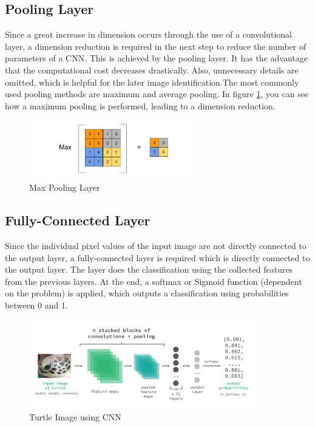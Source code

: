 \subsection{Pooling Layer}
Since a great increase in dimension occurs through the use of a convolutional layer, a dimension reduction is required in the next step to reduce the number of parameters of a CNN. This is achieved by the pooling layer. It has the advantage that the computational cost decreases drastically. Also, unnecessary details are omitted, which is helpful for the later image identification.The most commonly used pooling methods are maximum and average pooling. In figure \ref{fig:poolingLayer}, you can see how a maximum pooling is performed, leading to a dimension reduction.

\begin{figure}[htb]
    \centering
    \includegraphics[width=7cm]{images/maxpooling.jpg}
    \caption{Max Pooling Layer}
    \label{fig:poolingLayer}
\end{figure}

\subsection{Fully-Connected Layer}
Since the individual pixel values of the input image are not directly connected to the output layer, a fully-connected layer is required which is directly connected to the output layer. The layer does the classification using the collected features from the previous layers. At the end, a softmax or Sigmoid function (dependent on the problem) is applied, which outputs a classification using probabilities between 0 and 1.

\begin{figure}[htb]
    \centering
    \includegraphics[width=10cm]{images/cnn_turtle_pooling.png}
    \caption{Turtle Image using CNN}
    \label{fig:turtleCNN}
\end{figure}